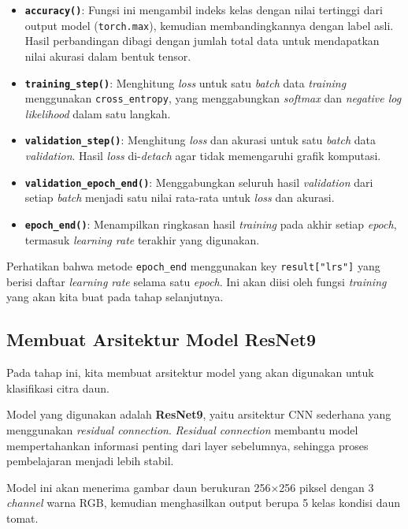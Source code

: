 \begin{itemize}
    \item \textbf{\texttt{accuracy()}}: Fungsi ini mengambil indeks kelas dengan nilai tertinggi dari output model (\texttt{torch.max}), kemudian membandingkannya dengan label asli. Hasil perbandingan dibagi dengan jumlah total data untuk mendapatkan nilai akurasi dalam bentuk tensor.
    \item \textbf{\texttt{training\_step()}}: Menghitung \textit{loss} untuk satu \textit{batch} data \textit{training} menggunakan \texttt{cross\_entropy}, yang menggabungkan \textit{softmax} dan \textit{negative log likelihood} dalam satu langkah.
    \item \textbf{\texttt{validation\_step()}}: Menghitung \textit{loss} dan akurasi untuk satu \textit{batch} data \textit{validation}. Hasil \textit{loss} di-\textit{detach} agar tidak memengaruhi grafik komputasi.
    \item \textbf{\texttt{validation\_epoch\_end()}}: Menggabungkan seluruh hasil \textit{validation} dari setiap \textit{batch} menjadi satu nilai rata-rata untuk \textit{loss} dan akurasi.
    \item \textbf{\texttt{epoch\_end()}}: Menampilkan ringkasan hasil \textit{training} pada akhir setiap \textit{epoch}, termasuk \textit{learning rate} terakhir yang digunakan.
\end{itemize}

Perhatikan bahwa metode \texttt{epoch\_end} menggunakan key \texttt{result["lrs"]} yang berisi daftar \textit{learning rate} selama satu \textit{epoch}. Ini akan diisi oleh fungsi \textit{training} yang akan kita buat pada tahap selanjutnya.

\subsection{Membuat Arsitektur Model ResNet9}

Pada tahap ini, kita membuat arsitektur model yang akan digunakan untuk klasifikasi citra daun.

Model yang digunakan adalah \textbf{ResNet9}, yaitu arsitektur CNN sederhana yang menggunakan \textit{residual connection}. \textit{Residual connection} membantu model mempertahankan informasi penting dari layer sebelumnya, sehingga proses pembelajaran menjadi lebih stabil.

Model ini akan menerima gambar daun berukuran 256×256 piksel dengan 3 \textit{channel} warna RGB, kemudian menghasilkan output berupa 5 kelas kondisi daun tomat.

